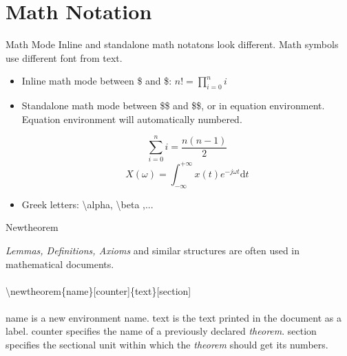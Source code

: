 \documentclass[10pt]{beamer}
\begin{document}
\section{Math Notation}
\begin{frame}{Math Mode}
    Inline and standalone math notatons look different. Math symbols
    use different font from text.
\begin{itemize}
    \item Inline math mode between \$ and \$: $n!=\prod_{i=0}^n i$
    \item Standalone math mode between \$\$ and \$\$, or in
        \alert{equation} environment. Equation environment will
        automatically numbered.

        \begin{equation}
            \sum_{i=0}^n i = \frac{n (n-1)}{2}
        \end{equation}
        \begin{equation}
            X(\omega) = \int_{-\infty}^{+\infty}
                x(t) e^{-j\omega t}\mathrm{d} t
        \end{equation}
    \item Greek letters: \textbackslash alpha, \textbackslash beta ,...

\end{itemize}
\end{frame}

\begin{frame}{Newtheorem}

{\em Lemmas, Definitions, Axioms} and similar structures are often used
in mathematical documents.
\ \\ \ \\

\qquad \textbackslash newtheorem\{name\}[counter]\{text\}[section]
\ \\ \ \\

\alert{name} is a new environment name. \alert{text} is the text
printed in the document as a label. \alert{counter} specifies the 
name of a previously declared {\em theorem}. \alert{section} specifies
the sectional unit within which the {\em theorem} should get its numbers.

\end{frame}
\end{document}
